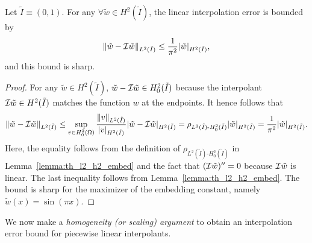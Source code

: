 \begin{proposition}
  \label{prop:th_lin_interp_L2_ref}
  Let $\tilde I \equiv (0,1)$.  For any $\forall \tilde w \in H^2(\tilde I)$, the linear interpolation error is bounded by 
  \begin{equation*}
    \| \tilde w - \mathcal{I} \tilde w \|_{L^2(\tilde I)}
    \leq \frac{1}{\pi^2} | \tilde w |_{H^2(\tilde I)},
  \end{equation*}
  and this bound is sharp.
  \begin{proof}
    For any $\tilde w \in H^2(\tilde I)$, $\tilde w - \mathcal{I} \tilde w \in H^2_0(\tilde I)$ because the interpolant $\mathcal{I} \tilde w \in H^2(\tilde I)$ matches the function $w$ at the endpoints. It hence follows that
    \begin{equation*}
      \| \tilde w - \mathcal{I} \tilde w \|_{L^2(\tilde I)}
      \leq \sup_{v \in H^2_0(\Omega)} \frac{\| v \|_{L^2(\tilde I)}}{| v |_{H^2(\tilde I)}} | \tilde w - \mathcal{I} \tilde w |_{H^2(\tilde I)}
      =
     \rho_{L^2(\tilde I)\text{-}H^2_0(\tilde I)} | \tilde w |_{H^2(\tilde I)}
      = \frac{1}{\pi^2} | \tilde w |_{H^2(\tilde I)} .
    \end{equation*}
    Here, the equality follows from the definition of $\rho_{L^2(\tilde I)\text{-}H^2_0(\tilde I)}$ in Lemma~\ref{lemma:th_l2_h2_embed} and the fact that $(\mathcal{I} \tilde w)'' = 0$ because $\mathcal{I} \tilde w$ is linear.  The last inequality follows from Lemma~\ref{lemma:th_l2_h2_embed}.  The bound is sharp for the maximizer of the embedding constant, namely $\tilde w(x) = \sin(\pi x)$.
  \end{proof}
\end{proposition}
We now make a \emph{homogeneity (or scaling) argument} to obtain an interpolation error bound for piecewise linear interpolants. %

